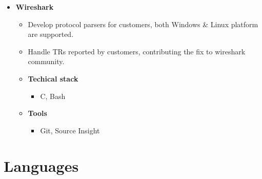 \documentclass[11pt,a4paper,sans]{moderncv}        %
\begin{document}
{\begin{itemize}
\begin{itemize}
    \item \textbf{Tools}
        \begin{itemize}
        \item Git, Vim, Eclipse
        \end{itemize}
    \end{itemize}
\item \textbf{Wireshark}
    \begin{itemize}
    \item Develop protocol parsers for customers, both Windows \& Linux platform are supported.
    \item Handle TRs reported by customers, contributing the fix to wireshark community.
    \item \textbf{Techical stack}
        \begin{itemize}
        \item C, Bash
        \end{itemize}
    \item \textbf{Tools}
        \begin{itemize}
        \item Git, Source Insight
        \end{itemize}
    \end{itemize}
\end{itemize}}

\section{Languages}

\clearpage
\end{document}
